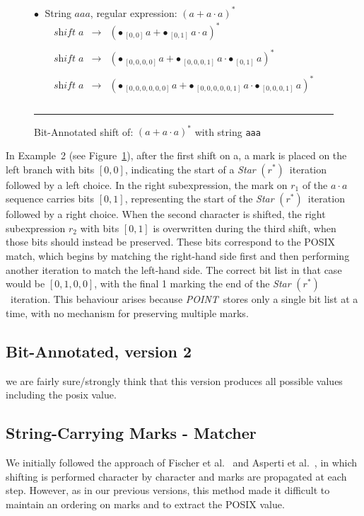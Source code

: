 \documentclass[12pt]{article}
\newcommand{\shift}{\textit{shift}}
\newcommand{\Marked}[1]{\bullet\,#1}
\newcommand{\POINT}{\textit{POINT}}
\newcommand{\STARText}{\textit{Star} $(r^*)$}
\begin{document}
  \begin{figure}[ht]
    $\bullet\;$ String $aaa$, regular expression: $(a + a \cdot a)^*$
    \[
    \begin{array}{rcl}
      \shift\; a & \rightarrow & ( \Marked{_{[0,0]\,} a} +  \Marked{_{[0,1]}\,a \cdot a} )^*\\\\
      \shift\; a & \rightarrow & ( \Marked{_{[0,0,0,0]\,} a} +  \Marked{_{[0,0,0,1]}\,a \cdot \Marked{_{[0,1]}\,a} } )^*\\\\ 
      \shift\; a & \rightarrow & ( \Marked{_{[0,0,0,0,0,0]\,} a} +  \Marked{_{[0,0,0,0,0,1]}\,a \cdot \Marked{_{[0,0,0,1]}\,a} } )^*\\\\
    \end{array}
    \]

    \mbox{}
    \hrule
    
    \caption{Bit-Annotated shift of: $(a + a \cdot a)^*$ with string \texttt{aaa}} \label{BitAnnotatedShiftExample2}
  \end{figure}
In Example~2 (see Figure~\ref{BitAnnotatedShiftExample2}), after the first shift on a, a mark is
placed on the left branch with bits $[0,0]$, indicating the start of a \STARText\ iteration followed by a
left choice. In the right subexpression, the mark on $r_1$ of the $a \cdot a$ sequence carries bits $[0,1]$,
representing the start of the \STARText\ iteration followed by a right choice. When the second character is shifted, the right subexpression $r_2$ with bits $[0,1]$ is overwritten during
the third shift, when those bits should instead be preserved. These bits correspond to the POSIX match,
which begins by matching the right-hand side first and then performing another iteration to match the
left-hand side. The correct bit list in that case would be $[0,1,0,0]$, with the final 1 marking the end of
the \STARText\ iteration. This behaviour arises because \POINT\ stores only a single bit list at a time,
with no mechanism for preserving multiple marks.

  
\FloatBarrier
\subsection{Bit-Annotated, version 2}
we are fairly sure/strongly think that this version produces all possible values including the posix value.

\FloatBarrier
\subsection{String-Carrying Marks - Matcher}
We initially followed the approach of Fischer et al.~\cite{Fischer2010} and Asperti et al.~\cite{Asperti2010}, in which shifting is performed character by 
character and marks are propagated at each step. However, as in our previous versions, this method made it difficult to maintain an ordering on marks and to 
extract the POSIX value.  
\end{document}
